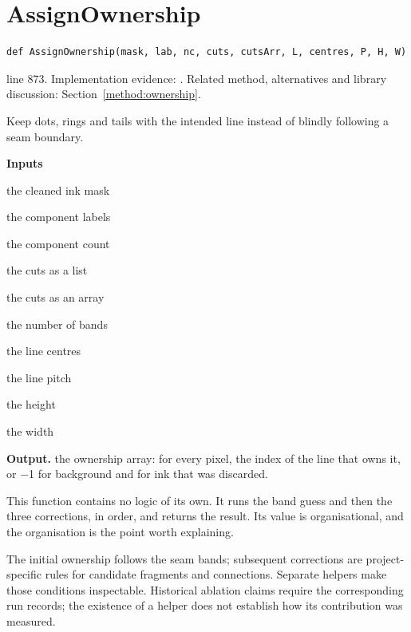 \section{AssignOwnership}\label{fn:segment:AssignOwnership}
\begin{lstlisting}[style=sig]
def AssignOwnership(mask, lab, nc, cuts, cutsArr, L, centres, P, H, W)
\end{lstlisting}
 line 873. Implementation evidence: \cite{code2026}. Related method, alternatives and library discussion: Section~\ref{method:ownership}.


Keep dots, rings and tails with the intended line instead of blindly following a seam boundary.




\noindent\textbf{Inputs}
\begin{description}[leftmargin=2.2em,style=nextline,font=\normalfont\ttfamily]\setlength\itemsep{1pt}
  \item[{mask}] \normalfont the cleaned ink mask
  \item[{lab}] \normalfont the component labels
  \item[{nc}] \normalfont the component count
  \item[{cuts}] \normalfont the cuts as a list
  \item[{cutsArr}] \normalfont the cuts as an array
  \item[{L}] \normalfont the number of bands
  \item[{centres}] \normalfont the line centres
  \item[{P}] \normalfont the line pitch
  \item[{H}] \normalfont the height
  \item[{W}] \normalfont the width
\end{description}

\noindent\textbf{Output.} the ownership array: for every pixel, the index of the line that owns it, or $-$1 for background and for ink that was discarded.


This function contains no logic of its own. It runs the band guess and then the three corrections, in order, and returns the result. Its value is organisational, and the organisation is the point worth explaining.


The initial ownership follows the seam bands; subsequent corrections are project-specific rules for candidate fragments and connections. Separate helpers make those conditions inspectable. Historical ablation claims require the corresponding run records; the existence of a helper does not establish how its contribution was measured.


